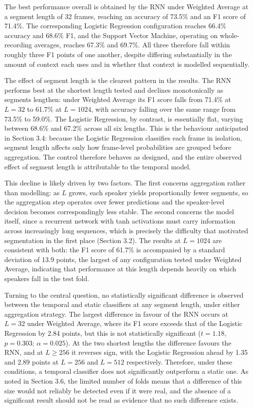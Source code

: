 \documentclass{mproj}
\begin{document}
The best performance overall is obtained by the RNN under Weighted Average at a segment length of 32 frames, reaching an accuracy of 73.5\% and an F1 score of 71.4\%. The corresponding Logistic Regression configuration reaches 66.4\% accuracy and 68.6\% F1, and the Support Vector Machine, operating on whole-recording averages, reaches 67.3\% and 69.7\%. All three therefore fall within roughly three F1 points of one another, despite differing substantially in the amount of context each uses and in whether that context is modelled sequentially.

The effect of segment length is the clearest pattern in the results. The RNN performs best at the shortest length tested and declines monotonically as segments lengthen: under Weighted Average its F1 score falls from 71.4\% at $L = 32$ to 61.7\% at $L = 1024$, with accuracy falling over the same range from 73.5\% to 59.0\%. The Logistic Regression, by contrast, is essentially flat, varying between 68.6\% and 67.2\% across all six lengths. This is the behaviour anticipated in Section 3.4: because the Logistic Regression classifies each frame in isolation, segment length affects only how frame-level probabilities are grouped before aggregation. The control therefore behaves as designed, and the entire observed effect of segment length is attributable to the temporal model.

This decline is likely driven by two factors. The first concerns aggregation rather than modelling: as $L$ grows, each speaker yields proportionally fewer segments, so the aggregation step operates over fewer predictions and the speaker-level decision becomes correspondingly less stable. The second concerns the model itself, since a recurrent network with tanh activations must carry information across increasingly long sequences, which is precisely the difficulty that motivated segmentation in the first place (Section 3.2). The results at $L = 1024$ are consistent with both: the F1 score of 61.7\% is accompanied by a standard deviation of 13.9 points, the largest of any configuration tested under Weighted Average, indicating that performance at this length depends heavily on which speakers fall in the test fold.

Turning to the central question, no statistically significant difference is observed between the temporal and static classifiers at any segment length, under either aggregation strategy. The largest difference in favour of the RNN occurs at $L = 32$ under Weighted Average, where its F1 score exceeds that of the Logistic Regression by 2.84 points, but this is not statistically significant ($t = 1.18$, $p = 0.303$; $\alpha = 0.025$). At the two shortest lengths the difference favours the RNN, and at $L \geq 256$ it reverses sign, with the Logistic Regression ahead by 1.35 and 2.89 points at $L = 256$ and $L = 512$ respectively. Therefore, under these conditions, a temporal classifier does not significantly outperform a static one. As noted in Section 3.6, the limited number of folds means that a difference of this size would not reliably be detected even if it were real, and the absence of a significant result should not be read as evidence that no such difference exists.
\end{document}
